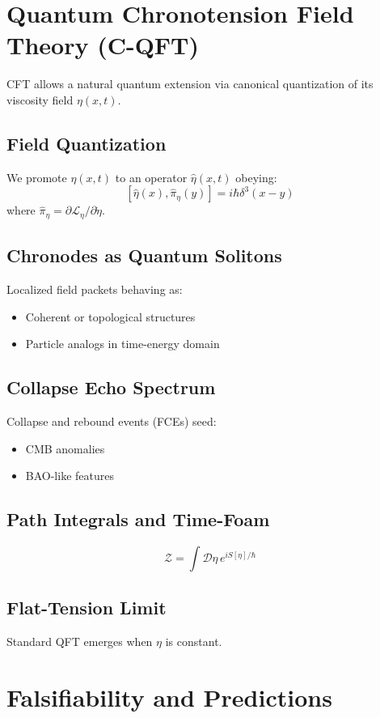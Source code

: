 \documentclass[11pt]{article}
\begin{document}
\section{Quantum Chronotension Field Theory (C-QFT)}
CFT allows a natural quantum extension via canonical quantization of its viscosity field $\eta(x, t)$.

\subsection{Field Quantization}
We promote $\eta(x, t)$ to an operator $\hat{\eta}(x, t)$ obeying:
\[
[\hat{\eta}(x), \hat{\pi}_\eta(y)] = i\hbar \delta^3(x - y)
\]
where $\hat{\pi}_\eta = \partial \mathcal{L}_\eta / \partial \dot{\eta}$.

\subsection{Chronodes as Quantum Solitons}
Localized field packets behaving as:
\begin{itemize}
    \item Coherent or topological structures
    \item Particle analogs in time-energy domain
\end{itemize}

\subsection{Collapse Echo Spectrum}
Collapse and rebound events (FCEs) seed:
\begin{itemize}
    \item CMB anomalies
    \item BAO-like features
\end{itemize}

\subsection{Path Integrals and Time-Foam}
\[
\mathcal{Z} = \int \mathcal{D}\eta \, e^{i S[\eta]/\hbar}
\]

\subsection{Flat-Tension Limit}
Standard QFT emerges when $\eta$ is constant.

\section{Falsifiability and Predictions}
\end{document}
